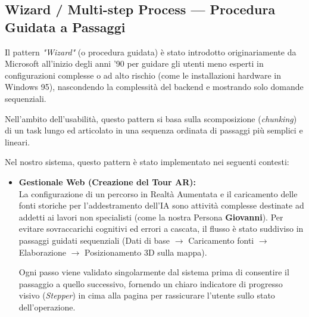 \subsection[Wizard / Multi-step Process]{Wizard / Multi-step Process --- Procedura Guidata a Passaggi}
Il pattern \textit{"Wizard"} (o procedura guidata) è stato introdotto originariamente da Microsoft all'inizio degli anni '90 per guidare gli utenti meno esperti in configurazioni complesse o ad alto rischio (come le installazioni hardware in Windows 95), nascondendo la complessità del backend e mostrando solo domande sequenziali. 

Nell'ambito dell'usabilità, questo pattern si basa sulla scomposizione (\textit{chunking}) di un task lungo ed articolato in una sequenza ordinata di passaggi più semplici e lineari.

Nel nostro sistema, questo pattern è stato implementato nei seguenti contesti:
\begin{itemize}[leftmargin=1.5em]
    \item \textbf{Gestionale Web (Creazione del Tour AR):}\\
    La configurazione di un percorso in Realtà Aumentata e il caricamento delle fonti storiche per l'addestramento dell'IA sono attività complesse destinate ad addetti ai lavori non specialisti (come la nostra Persona \textbf{Giovanni}). Per evitare sovraccarichi cognitivi ed errori a cascata, il flusso è stato suddiviso in passaggi guidati sequenziali (Dati di base $\rightarrow$ Caricamento fonti $\rightarrow$ Elaborazione $\rightarrow$ Posizionamento 3D sulla mappa). 
    
    Ogni passo viene validato singolarmente dal sistema prima di consentire il passaggio a quello successivo, fornendo un chiaro indicatore di progresso visivo (\textit{Stepper}) in cima alla pagina per rassicurare l'utente sullo stato dell'operazione.
\end{itemize}

